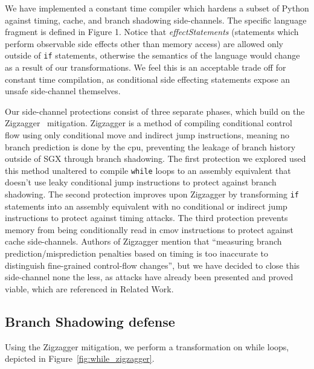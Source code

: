 \documentclass[sigplan, review]{acmart}
\begin{document}
\begingroup\vspace*{-\baselineskip}
\vspace*{\baselineskip}\endgroup

We have implemented a constant time compiler which hardens a subset of Python against timing, cache, and branch shadowing side-channels. The specific language fragment is defined in Figure 1. Notice that \textit{effectStatements} (statements which perform observable side effects other than memory access) are allowed only outside of \texttt{if} statements, otherwise the semantics of the language would change as a result of our transformations. We feel this is an acceptable trade off for constant time compilation, as conditional side effecting statements expose an unsafe side-channel themselves.

Our side-channel protections consist of three separate phases, which build on the Zigzagger~\cite{lee2016inferring} mitigation. Zigzagger is a method of compiling conditional control flow using only conditional move and indirect jump instructions, meaning no branch prediction is done by the cpu, preventing the leakage of branch history outside of SGX through branch shadowing. The first protection we explored used this method unaltered to compile \texttt{while} loops to an assembly equivalent that doesn't use leaky conditional jump instructions to protect against branch shadowing. The second protection improves upon Zigzagger by transforming \texttt{if} statements into an assembly equivalent with no conditional or indirect jump instructions to protect against timing attacks. The third protection prevents memory from being conditionally read in cmov instructions to protect against cache side-channels. Authors of Zigzagger mention that ``measuring branch prediction/misprediction penalties based on timing is too inaccurate to distinguish fine-grained control-flow changes'', but we have decided to close this side-channel none the less, as attacks have already been presented and proved viable, which are referenced in Related Work.

\subsection{Branch Shadowing defense}
Using the Zigzagger mitigation, we perform a transformation on while loops, depicted in Figure~\ref{fig:while_zigzagger}.
\end{document}
